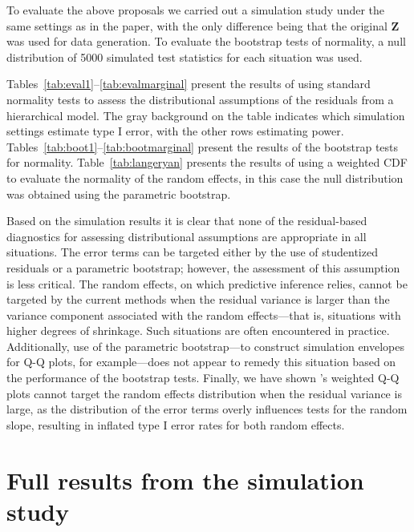 \documentclass[11pt]{article} %
\begin{document}
To evaluate the above proposals we carried out a simulation study under the same settings as in the paper, with the only difference being that the original $\bm{Z}$ was used for data generation. To evaluate the bootstrap tests of normality, a null distribution of 5000 simulated test statistics for each situation was used.

Tables~\ref{tab:eval1}--\ref{tab:evalmarginal} present the results of using standard normality tests to assess the distributional assumptions of the residuals from a hierarchical model. The gray background on the table indicates which simulation settings estimate type I error, with the other rows estimating power. Tables~\ref{tab:boot1}--\ref{tab:bootmarginal} present the results of the bootstrap tests for normality. Table~\ref{tab:langeryan} presents the results of using a weighted CDF to evaluate the normality of the random effects, in this case the null distribution was obtained using the parametric bootstrap.

Based on the simulation results it is clear that none of the residual-based diagnostics for assessing distributional assumptions are appropriate in all situations. The error terms can be targeted either by the use of studentized residuals or a parametric bootstrap; however, the assessment of this assumption is less critical. The random effects, on which predictive inference relies, cannot be targeted by the current methods when the residual variance is larger than the variance component associated with the random effects---that is, situations with higher degrees of shrinkage.  Such situations are often encountered in practice. Additionally, use of the parametric bootstrap---to construct simulation envelopes for Q-Q plots, for example---does not appear to remedy this situation based on the performance of the bootstrap tests. Finally, we have shown \citeauthor{Lange:1989uu}'s weighted Q-Q plots cannot target the random effects distribution when the residual variance is large, as the distribution of the error terms overly influences tests for the random slope, resulting in inflated type I error rates for both random effects.




\section{Full results from the simulation study}\label{supp:simstudy}
\end{document}
